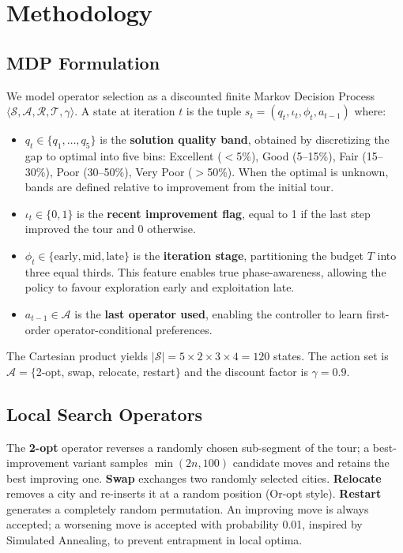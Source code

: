 \documentclass{article}
\begin{document}
\section{Methodology}

\subsection{MDP Formulation}

We model operator selection as a discounted finite Markov Decision Process
$\langle \mathcal{S}, \mathcal{A}, \mathcal{R}, \mathcal{T}, \gamma \rangle$.
A state at iteration $t$ is the tuple $s_t = (q_t, \iota_t, \phi_t, a_{t-1})$
where:

\begin{itemize}
\item $q_t \in \{q_1,\ldots,q_5\}$ is the \textbf{solution quality band},
obtained by discretizing the gap to optimal into five bins: Excellent ($<$5\%),
Good (5--15\%), Fair (15--30\%), Poor (30--50\%), Very Poor ($>$50\%). When the
optimal is unknown, bands are defined relative to improvement from the initial
tour.

\item $\iota_t \in \{0, 1\}$ is the \textbf{recent improvement flag}, equal to
1 if the last step improved the tour and 0 otherwise.

\item $\phi_t \in \{\text{early}, \text{mid}, \text{late}\}$ is the
\textbf{iteration stage}, partitioning the budget $T$ into three equal thirds.
This feature enables true phase-awareness, allowing the policy to favour
exploration early and exploitation late.

\item $a_{t-1} \in \mathcal{A}$ is the \textbf{last operator used}, enabling
the controller to learn first-order operator-conditional preferences.
\end{itemize}

The Cartesian product yields $|\mathcal{S}| = 5 \times 2 \times 3 \times 4 =
120$ states. The action set is $\mathcal{A} = \{$2-opt, swap, relocate,
restart$\}$ and the discount factor is $\gamma = 0.9$.

\subsection{Local Search Operators}

The \textbf{2-opt} operator reverses a randomly chosen sub-segment of the tour;
a best-improvement variant samples $\min(2n, 100)$ candidate moves and retains
the best improving one. \textbf{Swap} exchanges two randomly selected cities.
\textbf{Relocate} removes a city and re-inserts it at a random position
(Or-opt style). \textbf{Restart} generates a completely random permutation.
An improving move is always accepted; a worsening move is accepted with
probability 0.01, inspired by Simulated Annealing, to prevent entrapment in
local optima.
\end{document}
